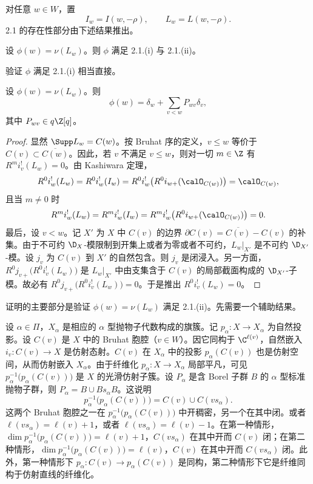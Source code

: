 对任意 $w\in W$，置
$$I_w=I(w,-\rho),\qquad L_w=L(w,-\rho).$$
2.1 的存在性部分由下述结果推出。

\begin{proposition}\label{prop:05.2.5}
设 $\phi(w)=\nu(L_w)$。则 $\phi$ 满足 2.1.(i) 与 2.1.(ii)。
\end{proposition}

验证 $\phi$ 满足 2.1.(i) 相当直接。

\begin{lemma}\label{lem:05.2.6}
设 $\phi(w)=\nu(L_w)$。则
$$\phi(w)=\delta_w+\sum_{v<w}P_{wv}\delta_v,$$
其中 $P_{wv}\in q\Z[q]$。
\end{lemma}

\begin{proof}
显然 $\Supp L_w=C(w)$。按 Bruhat 序的定义，$v\leq w$ 等价于 $C(v)\subset\overline{C(w)}$。因此，若 $v$ 不满足 $v\leq w$，则对一切 $m\in\Z$ 有 $R^mi_v^!(L_w)=0$。由 Kashiwara 定理，
$$R^0i_w^!(L_w)=R^0i_w^!(I_w)=R^0i_w^!\bigl(R^0i_{w+}(\calO_{C(w)})\bigr)=\calO_{C(w)},$$
且当 $m\neq 0$ 时
$$R^mi_w^!(L_w)=R^mi_w^!(I_w)=R^mi_w^!\bigl(R^0i_{w+}(\calO_{C(w)})\bigr)=0.$$
最后，设 $v<w$。记 $X'$ 为 $X$ 中 $C(v)$ 的边界 $\partial C(v)=\overline{C(v)}-C(v)$ 的补集。由于不可约 $\D_X$-模限制到开集上或者为零或者不可约，$L_w|_{X'}$ 是不可约 $\D_{X'}$-模。设 $j_v$ 为 $C(v)$ 到 $X'$ 的自然包含。则 $j_v$ 是闭浸入。另一方面，$R^0j_{v+}\bigl(R^0i_v^!(L_w)\bigr)$ 是 $L_w|_{X'}$ 中由支集含于 $C(v)$ 的局部截面构成的 $\D_{X'}$-子模。故必有 $R^0j_{v+}\bigl(R^0i_v^!(L_w)\bigr)=0$。于是推出 $R^0i_v^!(L_w)=0$。
\end{proof}

证明的主要部分是验证 $\phi(w)=\nu(L_w)$ 满足 2.1.(ii)。先需要一个辅助结果。

设 $\alpha\in\Pi$，$X_\alpha$ 是相应的 $\alpha$ 型抛物子代数构成的旗簇。记 $p_\alpha:X\to X_\alpha$ 为自然投影。设 $C(v)$ 是 $X$ 中的 Bruhat 胞腔（$v\in W$）。因它同构于 $\C^{\ell(v)}$，自然嵌入 $i_v:C(v)\to X$ 是仿射态射。$C(v)$ 在 $X_\alpha$ 中的投影 $p_\alpha(C(v))$ 也是仿射空间，从而仿射嵌入 $X_\alpha$。由于纤维化 $p_\alpha:X\to X_\alpha$ 局部平凡，可见 $p_\alpha^{-1}\bigl(p_\alpha(C(v))\bigr)$ 是 $X$ 的光滑仿射子簇。设 $P_\alpha$ 是含 Borel 子群 $B$ 的 $\alpha$ 型标准抛物子群，则 $P_\alpha=B\cup Bs_\alpha B$。这说明
$$p_\alpha^{-1}\bigl(p_\alpha(C(v))\bigr)=C(v)\cup C(vs_\alpha).$$
这两个 Bruhat 胞腔之一在 $p_\alpha^{-1}\bigl(p_\alpha(C(v))\bigr)$ 中开稠密，另一个在其中闭。或者 $\ell(vs_\alpha)=\ell(v)+1$，或者 $\ell(vs_\alpha)=\ell(v)-1$。在第一种情形，$\dim p_\alpha^{-1}\bigl(p_\alpha(C(v))\bigr)=\ell(v)+1$，$C(vs_\alpha)$ 在其中开而 $C(v)$ 闭；在第二种情形，$\dim p_\alpha^{-1}\bigl(p_\alpha(C(v))\bigr)=\ell(v)$，$C(v)$ 在其中开而 $C(vs_\alpha)$ 闭。此外，第一种情形下 $p_\alpha:C(v)\to p_\alpha(C(v))$ 是同构，第二种情形下它是纤维同构于仿射直线的纤维化。

